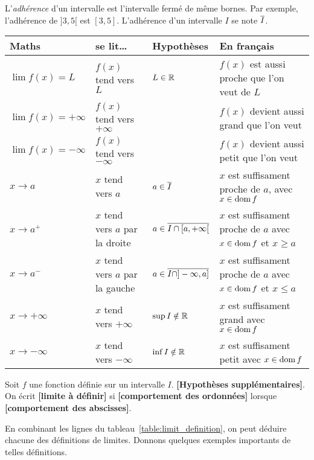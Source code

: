 \documentclass[main.tex]{subfiles}
\begin{document}
L'\emph{adhérence} d'un intervalle est l'intervalle fermé de même bornes.
Par exemple, l'adhérence de $]3, 5[$ est $[3, 5]$.
L'adhérence d'un intervalle $I$ se note $\overline{I}$.

\begin{sidewaystable}
    \centering
    \caption{Tableau récapitulatif pour les définitions de limite}
    \label{table:limit_definition}
    \begin{tabular}
        {l l l l}
        \toprule
        Maths & se lit\dots & Hypothèses & En français \\ \midrule
        $\lim f(x) = L$ & $f(x)$ tend vers $L$ & $L \in \mathbb{R}$ & $f(x)$ est aussi proche que l'on veut de $L$ \\
        $\lim f(x) = +\infty$ & $f(x)$ tend vers $+\infty$ & & $f(x)$ devient aussi grand que l'on veut\\
        $\lim f(x) = -\infty$ & $f(x)$ tend vers $-\infty$ & & $f(x)$ devient aussi petit que l'on veut\\
        $x \to a$ & $x$ tend vers $a$ & $a \in \overline{I}$ & $x$ est suffisament proche de $a$, avec $x \in \operatorname{dom} f$\\
        $x \to a^+$ & $x$ tend vers $a$ par la droite & $a \in \overline{I \cap [a, +\infty[}$ & $x$ est suffisament proche de $a$ avec $x \in \operatorname{dom} f$ et $x \geq a$\\
        $x \to a^-$ & $x$ tend vers $a$ par la gauche & $a \in \overline{I \cap ]-\infty, a]}$ & $x$ est suffisament proche de $a$ avec $x \in \operatorname{dom} f$ et $x \leq a$\\
        $x \to +\infty$ & $x$ tend vers $+\infty$ & $\sup I \notin \mathbb{R}$ & $x$ est suffisament grand avec $x \in \operatorname{dom} f$\\
        $x \to -\infty$ & $x$ tend vers $-\infty$ & $\inf I \notin \mathbb{R}$ & $x$ est suffisament petit avec $x \in \operatorname{dom} f$\\
        \bottomrule
    \end{tabular}
\end{sidewaystable}

\begin{definition}
    [Limite]

    Soit $f$ une fonction définie sur un intervalle $I$.
    \textbf{[Hypothèses supplémentaires]}.
    On écrit \textbf{[limite à définir]}
    si \textbf{[comportement des ordonnées]}
    lorsque \textbf{[comportement des abscisses]}.
\end{definition}

En combinant les lignes du tableau~\ref{table:limit_definition},
on peut déduire chacune des définitions de limites.
Donnons quelques exemples importants de telles définitions.
\end{document}
